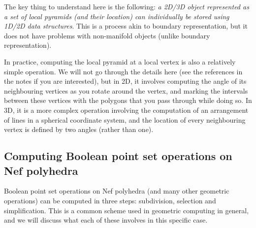 The key thing to understand here is the following: \emph{a 2D/3D object represented as a set of local pyramids (and their location) can individually be stored using 1D/2D data structures}.
This is a process akin to boundary representation, but it does not have problems with non-manifold objects (unlike boundary representation).

In practice, computing the local pyramid at a local vertex is also a relatively simple operation.
We will not go through the details here (see the references in the notes if you are interested), but in 2D, it involves computing the angle of its neighbouring vertices as you rotate around the vertex, and marking the intervals between these vertices with the polygons that you pass through while doing so.
In 3D, it is a more complex operation involving the computation of an arrangement of lines in a spherical coordinate system, and the location of every neighbouring vertex is defined by two angles (rather than one).

\subsection{Computing Boolean point set operations on Nef polyhedra}

Boolean point set operations on Nef polyhedra (and many other geometric operations) can be computed in three steps: subdivision, selection and simplification.
This is a common scheme used in geometric computing in general, and we will discuss what each of these involves in this specific case.

